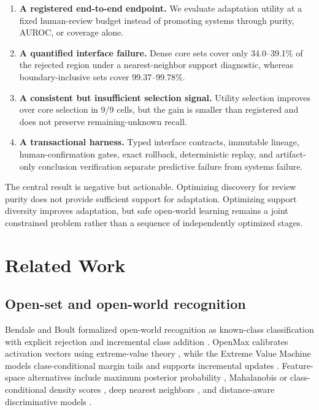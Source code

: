 \documentclass[10pt]{article}
\begin{document}
\begin{enumerate}
  \item \textbf{A registered end-to-end endpoint.} We evaluate adaptation
  utility at a fixed human-review budget instead of promoting systems through
  purity, AUROC, or coverage alone.

  \item \textbf{A quantified interface failure.} Dense core sets cover only
  34.0--39.1\% of the rejected region under a nearest-neighbor support
  diagnostic, whereas boundary-inclusive sets cover 99.37--99.78\%.

  \item \textbf{A consistent but insufficient selection signal.} Utility
  selection improves over core selection in 9/9 cells, but the gain is smaller
  than registered and does not preserve remaining-unknown recall.

  \item \textbf{A transactional harness.} Typed interface contracts,
  immutable lineage, human-confirmation gates, exact rollback, deterministic
  replay, and artifact-only conclusion verification separate predictive
  failure from systems failure.
\end{enumerate}

The central result is negative but actionable. Optimizing discovery for
review purity does not provide sufficient support for adaptation. Optimizing
support diversity improves adaptation, but safe open-world learning remains a
joint constrained problem rather than a sequence of independently optimized
stages.

\section{Related Work}

\subsection{Open-set and open-world recognition}

Bendale and Boult formalized open-world recognition as known-class
classification with explicit rejection and incremental class addition
\cite{bendale2015}. OpenMax calibrates activation vectors using extreme-value
theory \cite{bendale2016}, while the Extreme Value Machine models
class-conditional margin tails and supports incremental updates
\cite{rudd2018}. Feature-space alternatives include maximum posterior
probability \cite{hendrycks2017}, Mahalanobis or class-conditional density
scores \cite{lee2018,mukhoti2023}, deep nearest neighbors \cite{sun2022}, and
distance-aware discriminative models \cite{vanamersfoort2020,liu2020}.
\end{document}
